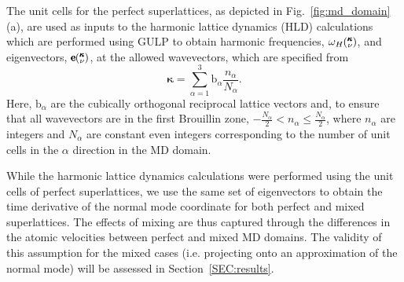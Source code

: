 The unit cells for the perfect superlattices, as depicted in Fig.~\ref{fig:md_domain}(a), are used as inputs to the harmonic lattice dynamics (HLD) calculations which are performed using GULP\cite{GULP} to obtain harmonic frequencies, $\omega_H \mspace{-4.0mu}\left(\mspace{-8.0mu} \begin{smallmatrix}&\pmb{\kappa} \\&\nu\end{smallmatrix} \mspace{-3.0mu}\right)$, and eigenvectors, $ \pmb{\mathrm{e}} \mspace{-4.0mu}\left(\mspace{-8.0mu} \begin{smallmatrix}&\pmb{\kappa} \\&\nu\end{smallmatrix} \mspace{-3.0mu}\right)$, at the allowed wavevectors, which are specified from
\begin{equation}\label{EQ:NMD:allowdkpt}
\pmb{\kappa} = \sum_{\alpha=1}^3 \pmb{\mathrm{b}}_{\alpha} \frac{n_{\alpha}}{N_{\alpha}}.
\end{equation}
Here, $\pmb{\mathrm{b}}_\alpha$ are the cubically orthogonal reciprocal lattice vectors and, to ensure that all wavevectors are in the first Brouillin zone, $ -\frac{N_\alpha}{2} < n_\alpha \le \frac {N_\alpha}{2}$, where $n_\alpha$ are integers and $N_\alpha$ are constant even integers corresponding to the number of unit cells in the $\alpha$ direction in the MD domain. 
\begin{comment}
Group velocities are calculated using finite differencing about a given frequency from \cite{ziman_electrons_2001}
\begin{equation}\label{EQ:NMD:vg}
\begin{split}
\pmb{\mathrm{v}}_{g}\kv=\frac{\partial \omega \kv}{\partial \pmb{\kappa}}.
\end{split}
\end{equation}
The eigenvectors, from HLD, and the atomic velocities, from MD simulations performed using LAMMPS\cite{LAMMPS}, are are used as inputs to obtain the trajectory of the time derivative at time, $t$, of the normal mode coordinate, $\dot{q}\kvt{}{}{}$, at time $t$ from
\begin{equation}\label{EQ:NMD:qdot}
\begin{split}
\dot{q}\kvt{}{}{}=&\SUM{0}{}\sqrt{\frac{m_b}{N}}\dot{u}_{\alpha}\lbt e^*\kvba\EXP{i\pmb{\kappa}\cdot\mathbf{r}_0\ab{l}{0}}.
\end{split}
\end{equation}
In Eq.~(\ref{EQ:NMD:qdot}), $\dot{u}_{\alpha}\lbt$ is the component of velocity of atom $b$ in the $l$th unit cell with equilibrium position $\mathbf{r}_0\ab{l}{0}$ in direction $\alpha$ and $e^*\kvba$ denotes the complex conjugate of the $\alpha$-component for atom $b$ of the eigenvector for mode  ~$\kv$. 
\end{comment}
While the harmonic lattice dynamics calculations were performed using the unit cells of perfect superlattices, we use the same set of eigenvectors to obtain the time derivative of the normal mode coordinate for both perfect and mixed superlattices. The effects of mixing are thus captured through the differences in the atomic velocities between perfect and mixed MD domains. The validity of this assumption for the mixed cases (i.e. projecting onto an approximation of the normal mode) will be assessed in Section~\ref{SEC:results}. 

